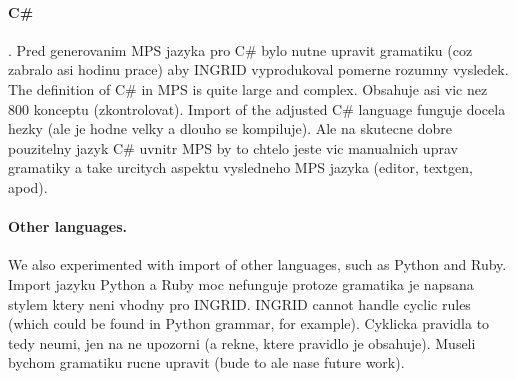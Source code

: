 \paragraph{C\#}.
Pred generovanim MPS jazyka pro C\# bylo nutne upravit gramatiku (coz zabralo asi hodinu prace) aby INGRID vyprodukoval pomerne rozumny vysledek.
The definition of C\# in MPS is quite large and complex.
Obsahuje asi vic nez 800 konceptu (zkontrolovat).
Import of the adjusted C\# language funguje docela hezky (ale je hodne velky a dlouho se kompiluje).
Ale na skutecne dobre pouzitelny jazyk C\# uvnitr MPS by to chtelo jeste vic manualnich uprav gramatiky a take urcitych aspektu vysledneho MPS jazyka (editor, textgen, apod).

\paragraph{Other languages.}
We also experimented with import of other languages, such as Python and Ruby.
Import jazyku Python a Ruby moc nefunguje protoze gramatika je napsana stylem ktery neni vhodny pro INGRID.
INGRID cannot handle cyclic rules (which could be found in Python grammar, for example).
Cyklicka pravidla to tedy neumi, jen na ne upozorni (a rekne, ktere pravidlo je obsahuje).
Museli bychom gramatiku rucne upravit (bude to ale nase future work).

